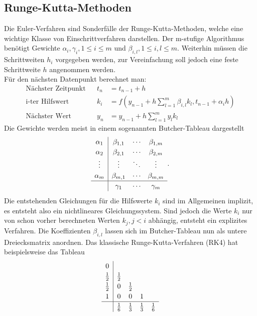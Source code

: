 \documentclass{scrartcl}
\begin{document}
\subsection{Runge-Kutta-Methoden}
Die Euler-Verfahren sind Sonderfälle der Runge-Kutta-Methoden, welche eine wichtige Klasse von Einschrittverfahren darstellen. Der m-stufige Algorithmus benötigt Gewichte $\alpha_i, \gamma_i, 1 \le i \le m$ und $\beta_{i,l}, 1\le i, l\le m$. Weiterhin müssen die Schrittweiten  $h_i$ vorgegeben werden, zur Vereinfachung soll jedoch eine feste Schrittweite $h$ angenommen werden.\\
Für den nächsten Datenpunkt berechnet man:
\begin{equation}
\begin{aligned}
	\text{Nächster Zeitpunkt} && t_n &= t_{n-1} + h \\
	\text{i-ter Hilfswert} && k_i &= f\left(y_{n-1} + h \sum_{l=1}^m \beta_{i,l}k_l, t_{n-1} + \alpha_i h\right) \\
	\text{Nächster Wert} && y_n &= y_{n-1} + h\sum_{l=1}^m y_l k_l
\end{aligned}
\end{equation}
Die Gewichte werden meist in einem sogenannten Butcher-Tableau dargestellt
\begin{equation*}
	\begin{array}{c|ccc}
	\alpha_1 	& \beta_{1,1}   & \cdots & \beta_{1,m} \\
	\alpha_2 	& \beta_{2,1}   & \cdots & \beta_{2,m} \\
	\vdots      & \vdots        & \ddots & \vdots        \\
	\alpha_m    & \beta_{m,1}   & \cdots & \beta_{m,m} \\
	\hline
	            & \gamma_1      & \cdots & \gamma_m
\end{array}.
\end{equation*}
Die entstehenden Gleichungen für die Hilfswerte $k_i$ sind im Allgemeinen implizit, es entsteht also ein nichtlineares Gleichungssystem. Sind jedoch die Werte $k_i$ nur von schon vorher berechneten Werten $k_j, j < i$ abhängig, entsteht ein explizites Verfahren. Die Koeffizienten $\beta_{i,l}$ lassen sich im Butcher-Tableau nun als untere Dreiecksmatrix anordnen. Das klassische Runge-Kutta-Verfahren (RK4) hat beispielsweise das Tableau
\begin{equation}
\renewcommand\arraystretch{1.2}
\begin{array}{c|cccc}
	0 &&&& \\
	\tfrac{1}{2} & \tfrac{1}{2} &&& \\
	\tfrac{1}{2} & 0 & \tfrac{1}{2} && \\
	1 & 0 & 0 & 1 &\\
	\hline
	& \tfrac{1}{6} & \tfrac{1}{3} & \tfrac{1}{3} & \tfrac{1}{6}
\end{array}
\end{equation}
\end{document}
